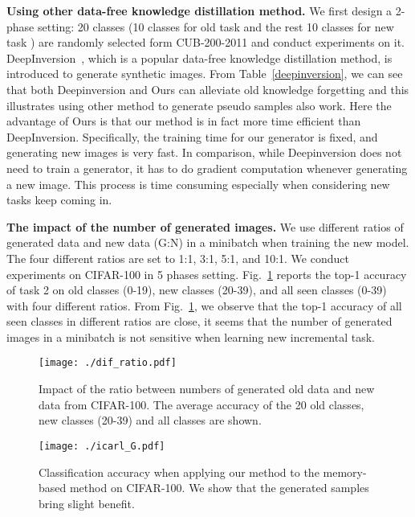 \documentclass[10pt,twocolumn,letterpaper]{article}
\begin{document}
\textbf{Using other data-free knowledge distillation method.} We first design a 2-phase setting: 20 classes (10 classes for old task and the rest 10 classes for new task ) are randomly selected form CUB-200-2011 and conduct experiments on it.
DeepInversion~\cite{yin2020dreaming}, which is a popular data-free knowledge distillation method, is introduced to generate synthetic images. From Table~\ref{deepinversion}, we can see that both Deepinversion and Ours can alleviate old knowledge forgetting and this illustrates using other method to generate pseudo samples also work. Here the advantage of Ours is that our method is in fact more time efficient than DeepInversion. Specifically, the training time for our generator is fixed, and generating new images is very fast. 
In comparison, while Deepinversion does not need to train a generator, it has to do gradient computation whenever generating a new image. This process is time consuming especially when considering new tasks keep coming in. 

\textbf{The impact of the number of generated images.}
We use different ratios of generated data and new data (G:N) in a minibatch when training the new model. The four different ratios are set to 1:1, 3:1, 5:1, and 10:1. 
We conduct experiments on CIFAR-100 in 5 phases setting.
Fig.~\ref{dif_ratio_G} reports the top-1 accuracy of task 2 on old classes (0-19), new classes (20-39), and all seen classes (0-39) with four different ratios.
From Fig.~\ref{dif_ratio_G}, we observe that the top-1 accuracy of all seen classes in different ratios are close, it seems that the number of generated images in a minibatch is not sensitive when learning new incremental task.


\begin{figure}[!t]
\begin{center}
 \texttt{[image: ./dif\_ratio.pdf]}
 \end{center}
 \vspace{-5mm}
\caption{{Impact of the ratio between numbers of generated old data and new data from CIFAR-100. The average accuracy of the 20 old classes, new classes (20-39) and all classes are shown.}}
\label{dif_ratio_G}
\end{figure}

\begin{figure}[!t]
\begin{center}
 \texttt{[image: ./icarl\_G.pdf]}
 \end{center}
 \vspace{-5mm}
\caption{Classification accuracy when applying our method to the memory-based method \cite{rebuffi2017icarl} on CIFAR-100. We show that the generated samples bring slight benefit.}
\label{iCaRL_G}
\end{figure}
\end{document}

